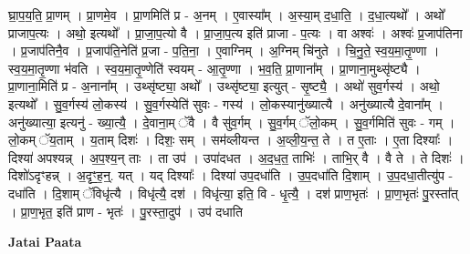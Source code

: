 \documentclass[17pt]{extarticle}
\begin{document}
घ्रा॒प॒य॒ति॒ प्रा॒णम् । प्रा॒णमे॒व । प्रा॒णमिति॑ प्र - अ॒नम् । ए॒वास्या᳚म् । अ॒स्या॒म् द॒धा॒ति॒ । द॒धा॒त्यथो᳚ । अथो᳚ प्राजाप॒त्यः । अथो॒ इत्यथो᳚ । प्रा॒जा॒प॒त्यो वै । प्रा॒जा॒प॒त्य इति॑ प्राजा - प॒त्यः । वा अश्वः॑ । अश्वः॑ प्र॒जाप॑तिना । प्र॒जाप॑तिनै॒व । प्र॒जाप॑ति॒नेति॑ प्र॒जा - प॒ति॒ना॒ । ए॒वाग्निम् । अ॒ग्निम् चि॑नुते । चि॒नु॒ते॒ स्व॒य॒मा॒तृ॒ण्णा । स्व॒य॒मा॒तृ॒ण्णा भ॑वति । स्व॒य॒मा॒तृ॒ण्णेति॑ स्वयम् - आ॒तृ॒ण्णा । भ॒व॒ति॒ प्रा॒णाना᳚म् । प्रा॒णाना॒मुथ्सृ॑ष्ट्यै । प्रा॒णाना॒मिति॑ प्र - अ॒नाना᳚म् । उथ्सृ॑ष्ट्या॒ अथो᳚ । उथ्सृ॑ष्ट्या॒ इत्युत् - सृ॒ष्ट्यै॒ । अथो॑ सुव॒र्गस्य॑ । अथो॒ इत्यथो᳚ । सु॒व॒र्गस्य॑ लो॒कस्य॑ । सु॒व॒र्गस्येति॑ सुवः - गस्य॑ । लो॒कस्यानु॑ख्यात्यै । अनु॑ख्यात्यै दे॒वाना᳚म् । अनु॑ख्यात्या॒ इत्यनु॑ - ख्या॒त्यै॒ । दे॒वाना॒म् ॅवै । वै सु॑व॒र्गम् । सु॒व॒र्गम् ॅलो॒कम् । सु॒व॒र्गमिति॑ सुवः - गम् । लो॒कम् ॅय॒ताम् । य॒ताम् दिशः॑ । दिशः॒ सम् । सम॑व्लीयन्त । अ॒व्ली॒य॒न्त॒ ते । त ए॒ताः । ए॒ता दिश्याः᳚ । दिश्या॑ अपश्यन्न् । अ॒प॒श्य॒न् ताः । ता उप॑ । उपा॑दधत । अ॒द॒ध॒त॒ ताभिः॑ । ताभि॒र् वै । वै ते । ते दिशः॑ । दिशो॑ऽदृꣳहन्न् । अ॒दृꣳ॒॒ह॒न्॒. यत् । यद् दिश्याः᳚ । दिश्या॑ उप॒दधा॑ति । उ॒प॒दधा॑ति दि॒शाम् । उ॒प॒दधा॒तीत्यु॑प - दधा॑ति । दि॒शाम् ॅविधृ॑त्यै । विधृ॑त्यै॒ दश॑ । विधृ॑त्या॒ इति॒ वि - धृ॒त्यै॒ । दश॑ प्राण॒भृतः॑ । प्रा॒ण॒भृतः॑ पु॒रस्ता᳚त् । प्रा॒ण॒भृत॒ इति॑ प्राण - भृतः॑ । पु॒रस्ता॒दुप॑ । उप॑ दधाति \newline

\textbf{Jatai Paata} \newline
\end{document}
